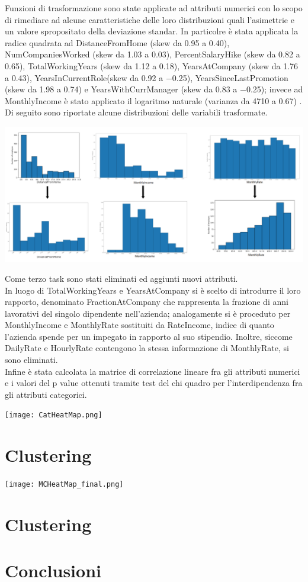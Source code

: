 \documentclass[english]{article}
\begin{document}
Funzioni di trasformazione sono state applicate ad attributi numerici con lo scopo di rimediare ad alcune caratteristiche delle loro distribuzioni quali l'asimettrie e un valore spropositato della deviazione standar. In particolre è stata applicata la radice quadrata ad DistanceFromHome (skew da 0.95 a 0.40), NumCompaniesWorked (skew da 1.03 a 0.03), PercentSalaryHike (skew da 0.82 a 0.65), TotalWorkingYears (skew da 1.12 a 0.18), YearsAtCompany (skew da 1.76 a 0.43), YearsInCurrentRole(skew da 0.92 a $-$0.25), YearsSinceLastPromotion (skew da 1.98 a 0.74) e YearsWithCurrManager (skew da 0.83 a $-$0.25); invece ad MonthlyIncome è stato applicato il logaritmo naturale (varianza da 4710 a 0.67) . Di seguito sono riportate alcune distribuzioni delle variabili trasformate.

\begin{center}
\includegraphics[scale=0.7]{trasformer.png}
\end{center}

Come terzo task sono stati eliminati ed aggiunti nuovi attributi.\\
In luogo di TotalWorkingYears e YearsAtCompany si è scelto di introdurre il loro rapporto, denominato FractionAtCompany che rappresenta la frazione di anni lavorativi del singolo dipendente nell'azienda; analogamente si è proceduto per MonthlyIncome e MonthlyRate sostituiti da RateIncome, indice di quanto l'azienda spende per un impegato in rapporto al suo stipendio. Inoltre, siccome DailyRate e HourlyRate contengono la stessa informazione di MonthlyRate, si sono eliminati.\\
Infine è stata calcolata la matrice di correlazione lineare fra gli attributi numerici e i valori del p value ottenuti tramite test del chi quadro per l'interdipendenza fra gli attributi categorici.
\begin{center}
\texttt{[image: CatHeatMap.png]}
\end{center}
\section{Clustering}

\begin{center}
\texttt{[image: MCHeatMap\_final.png]}
\end{center}
\section{Clustering}


\section{Conclusioni}
\end{document}
